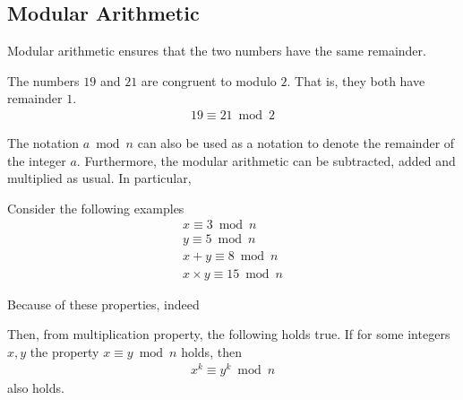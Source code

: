 \documentclass[a4paper]{article}
\theoremstyle{plain}
\newtheorem*{cor}{Corollary}
\theoremstyle{definition}
\newtheorem{exmp}{Example}[section]
\theoremstyle{remark}
\begin{document}
\subsection{Modular Arithmetic}
Modular arithmetic ensures that the two numbers have the same remainder.
\begin{tcolorbox}[colback=black!3!white,colframe=black!60!white,title=\begin{exmp}Modular Arithmetic \label{Modular Arithmetic}\end{exmp}]
        The numbers $19$ and $21$ are congruent to modulo $2$. That is, they both have remainder $1$.
                \begin{align}
                19   \equiv 21 \bmod 2	 
                \end{align}
\end{tcolorbox}
The notation $a \bmod n $ can also be used as a notation to denote the remainder of the integer $a$. Furthermore, the modular arithmetic can be subtracted, added and multiplied as usual. In particular,
\begin{tcolorbox}[colback=black!3!white,colframe=black!60!white,title=\begin{exmp}Properties of Modular Arithmetic \label{Properties of Modular Arithmetic}\end{exmp}]
        Consider the following examples
                \begin{align}
                x   \equiv 3 \bmod n \\
		y   \equiv 5 \bmod n \\
		x+y   \equiv 8 \bmod n \\
		x \times y   \equiv 15 \bmod n 
                \end{align}
\end{tcolorbox}
Because of these properties, indeed
\begin{tcolorbox}[colback=black!3!white,colframe=black!60!white,title=\begin{cor}Power of modular arithmetic \label{Power of modular arithmetic}\end{cor}]
        Then, from multiplication property, the following holds true. If for some integers $x,y$ the property $x   \equiv y \bmod n $ holds, then
                \begin{align}
                x^{k}   \equiv y^{k} \bmod n 
                \end{align}
		also holds.
\end{tcolorbox}
\end{document}
